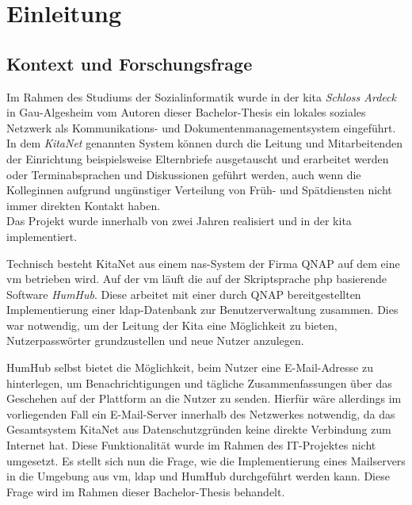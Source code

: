 
\setcounter{page}{1}

\chapter{Einleitung}
\label{sec:Einleitung}
\section{Kontext und Forschungsfrage}
\label{sec:Frage}
Im Rahmen des Studiums der Sozialinformatik wurde in der \ac{kita} \textit{Schloss Ardeck} in Gau-Algesheim vom Autoren dieser Bachelor-Thesis ein lokales soziales Netzwerk als Kommunikations- und Dokumentenmanagementsystem eingeführt. 
In dem \textit{KitaNet} genannten System können durch die Leitung und Mitarbeitenden der Einrichtung beispielsweise Elternbriefe ausgetauscht und erarbeitet werden oder Terminabsprachen und Diskussionen geführt werden, auch wenn die Kolleginnen aufgrund ungünstiger Verteilung von Früh- und Spätdiensten nicht immer direkten Kontakt haben. \\ 
Das Projekt wurde innerhalb von zwei Jahren realisiert und in der \ac{kita} implementiert.

Technisch besteht KitaNet aus einem \ac{nas}-System der Firma QNAP auf dem eine \ac{vm} betrieben wird.
Auf der \ac{vm} läuft die auf der Skriptsprache \ac{php} basierende Software \textit{HumHub}. 
Diese arbeitet mit einer durch QNAP bereitgestellten Implementierung einer \ac{ldap}-Datenbank zur Benutzerverwaltung zusammen. 
Dies war notwendig, um der Leitung der Kita eine Möglichkeit zu bieten, Nutzerpasswörter grundzustellen und neue Nutzer anzulegen.

HumHub selbst bietet die Möglichkeit, beim Nutzer eine E-Mail-Adresse zu hinterlegen, um Benachrichtigungen und tägliche Zusammenfassungen über das Geschehen auf der Plattform an die Nutzer zu senden.
Hierfür wäre allerdings im vorliegenden Fall ein E-Mail-Server innerhalb des Netzwerkes notwendig, da das Gesamtsystem KitaNet aus Datenschutzgründen keine direkte Verbindung zum Internet hat. 
Diese Funktionalität wurde im Rahmen des IT-Projektes nicht umgesetzt. 
Es stellt sich nun die Frage, wie die Implementierung eines Mailservers in die Umgebung aus \ac{vm}, \ac{ldap} und HumHub durchgeführt werden kann. 
Diese Frage wird im Rahmen dieser Bachelor-Thesis behandelt.


